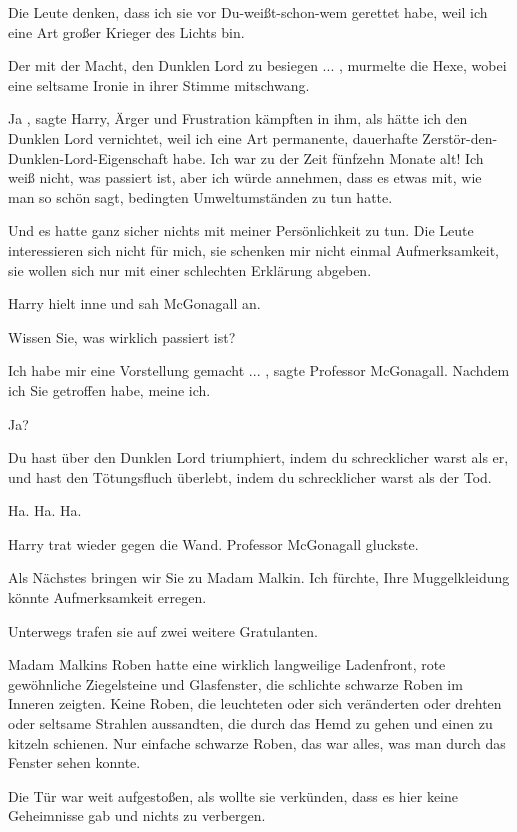 \glqq Die Leute denken, dass ich sie vor Du-weißt-schon-wem gerettet habe, weil ich eine Art großer Krieger
des Lichts bin.\grqq{}

\glqq Der mit der Macht, den Dunklen Lord zu besiegen ...\grqq{} ,
murmelte die
Hexe, wobei eine seltsame Ironie in ihrer Stimme mitschwang.

\glqq Ja\grqq{} , sagte Harry,
Ärger und
Frustration kämpften in ihm,
\glqq als hätte ich den Dunklen Lord vernichtet, weil ich eine Art permanente,
dauerhafte Zerstör-den-Dunklen-Lord-Eigenschaft habe. Ich war zu der Zeit fünfzehn Monate alt! Ich weiß nicht, was
passiert ist, aber ich würde annehmen, dass es etwas mit, wie man so schön sagt, bedingten Umweltumständen zu tun hatte.

Und es hatte ganz sicher nichts mit meiner Persönlichkeit zu tun. Die Leute interessieren sich nicht für
mich, sie schenken mir nicht einmal Aufmerksamkeit, sie wollen sich nur mit einer schlechten Erklärung abgeben.\grqq{}

Harry hielt inne und sah McGonagall an.

\glqq Wissen Sie, was wirklich passiert ist?\grqq{}

\glqq Ich habe mir eine Vorstellung gemacht ...\grqq{} , sagte Professor McGonagall. \glqq Nachdem ich Sie
getroffen habe, meine ich.\grqq{}

\glqq Ja?\grqq{}

\glqq Du hast über den Dunklen Lord
triumphiert, indem du schrecklicher warst als er, und hast den Tötungsfluch überlebt, indem du schrecklicher warst als
der Tod.\grqq{}

\glqq Ha. Ha. Ha.\grqq{}

Harry trat wieder gegen die Wand. Professor McGonagall
gluckste.

\glqq Als Nächstes bringen wir Sie zu Madam Malkin. Ich fürchte, Ihre Muggelkleidung könnte
Aufmerksamkeit erregen.\grqq{}

Unterwegs trafen sie auf zwei weitere Gratulanten.

Madam Malkins
Roben hatte eine wirklich langweilige Ladenfront, rote gewöhnliche Ziegelsteine und Glasfenster, die schlichte schwarze
Roben im Inneren zeigten. Keine Roben, die leuchteten oder sich veränderten oder drehten oder seltsame Strahlen
aussandten, die durch das Hemd zu gehen und einen zu kitzeln schienen. Nur einfache schwarze Roben, das war alles, was
man durch das Fenster sehen konnte.

Die Tür war weit aufgestoßen, als wollte sie verkünden, dass es hier
keine Geheimnisse gab und nichts zu verbergen.


